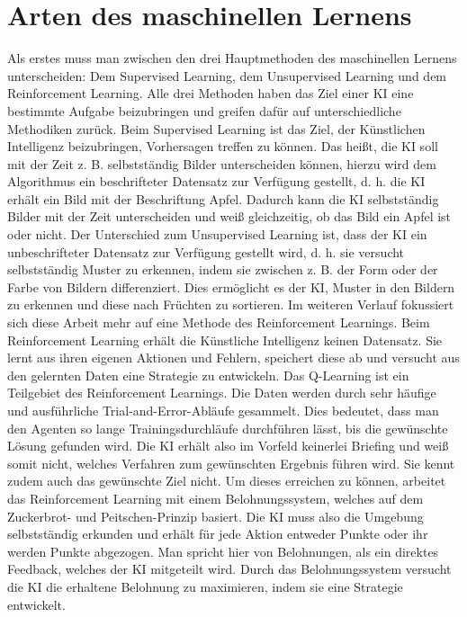 \documentclass[12pt,titlepage]{article}
\begin{document}
\section{Arten des maschinellen Lernens}
Als erstes muss man zwischen den drei Hauptmethoden des maschinellen Lernens unterscheiden: Dem Supervised Learning, dem Unsupervised Learning und dem Reinforcement Learning. Alle drei Methoden haben das Ziel einer KI eine bestimmte Aufgabe beizubringen und greifen dafür auf unterschiedliche Methodiken zurück.
Beim Supervised Learning ist das Ziel, der Künstlichen Intelligenz beizubringen, Vorhersagen treffen zu können. Das heißt, die KI soll mit der Zeit z. B. selbstständig Bilder unterscheiden können, hierzu wird dem Algorithmus ein beschrifteter Datensatz zur Verfügung gestellt, d. h. die KI erhält ein Bild mit der Beschriftung Apfel. Dadurch kann die KI selbstständig Bilder mit der Zeit unterscheiden und weiß gleichzeitig, ob das Bild ein Apfel ist oder nicht.
Der Unterschied zum Unsupervised Learning ist, dass der KI ein unbeschrifteter Datensatz zur Verfügung gestellt wird, d. h. sie versucht selbstständig Muster zu erkennen, indem sie zwischen z. B. der Form oder der Farbe von Bildern differenziert. Dies ermöglicht es der KI, Muster in den Bildern zu erkennen und diese nach Früchten zu sortieren.
Im weiteren Verlauf fokussiert sich diese Arbeit mehr auf eine Methode des Reinforcement Learnings. Beim Reinforcement Learning erhält die Künstliche Intelligenz keinen Datensatz. Sie lernt aus ihren eigenen Aktionen und Fehlern, speichert diese ab und versucht aus den gelernten Daten eine Strategie zu entwickeln.
Das Q-Learning ist ein Teilgebiet des Reinforcement Learnings. Die Daten werden durch sehr häufige und ausführliche Trial-and-Error-Abläufe gesammelt. Dies bedeutet, dass man den Agenten so lange Trainingsdurchläufe durchführen lässt, bis die gewünschte Lösung gefunden wird. Die KI erhält also im Vorfeld keinerlei Briefing und weiß somit nicht, welches Verfahren zum gewünschten Ergebnis führen wird. Sie kennt zudem auch das gewünschte Ziel nicht. Um dieses erreichen zu können, arbeitet das Reinforcement Learning mit einem Belohnungssystem, welches auf dem Zuckerbrot- und Peitschen-Prinzip basiert. Die KI muss also die Umgebung selbstständig erkunden und erhält für jede Aktion entweder Punkte oder ihr werden Punkte abgezogen. Man spricht hier von Belohnungen, als ein direktes Feedback, welches der KI mitgeteilt wird. Durch das Belohnungssystem versucht die KI die erhaltene Belohnung zu maximieren, indem sie eine Strategie entwickelt.
\\
\end{document}
